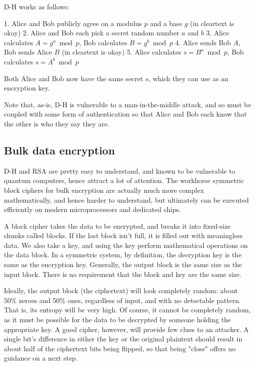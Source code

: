 \documentclass[%
 aip,
 jmp,%
 amsmath,amssymb,
 reprint,%
]{revtex4-1}
\begin{document}
D-H works as follows:

	1. Alice and Bob publicly agree on a modulus $p$ and a base $g$ (in cleartext is okay)
	2. Alice and Bob each pick a secret random number $a$ and $b$
	3. Alice calculates $A = g^a \bmod p$,
	   Bob calculates $B = g^b \bmod p$
	4. Alice sends Bob $A$, Bob sends Alice $B$ (in cleartext is okay)
	5. Alice calculates $s = B^a \bmod p$,
	   Bob calculates $s = A^b \bmod p$

Both Alice and Bob now have the same secret $s$, which they can use as
an encryption key.

Note that, as-is, D-H is vulnerable to a man-in-the-middle attack, and
so must be coupled with some form of authentication so that Alice and
Bob each know that the other is who they say they are.

\subsection{Bulk data encryption}

D-H and RSA are pretty easy to understand, and known to be vulnerable
to quantum computers, hence attract a lot of attention. The workhorse
symmetric block ciphers for bulk encryption are actually much more
complex mathematically, and hence harder to understand, but ultimately
can be executed efficiently on modern microprocessors and dedicated
chips.

A block cipher takes the data to be encrypted, and breaks it into
fixed-size chunks called blocks.  If the last block isn't full, it is
filled out with meaningless data.  We also take a key, and using the
key perform mathematical operations on the data block.  In a symmetric
system, by definition, the decryption key is the same as the
encryption key.  Generally, the output block is the same size as the
input block.  There is no requirement that the block and key are the
same size.

Ideally, the output block (the ciphertext) will look completely
random: about 50\% zeroes and 50\% ones, regardless of input, and with
no detectable pattern.  That is, its entropy will be very high.  Of
course, it cannot be completely random, as it must be possible for the
data to be decrypted by someone holding the appropriate key.  A good
cipher, however, will provide few clues to an attacker.  A single
bit's difference in either the key or the original plaintext should
result in about half of the ciphertext bits being flipped, so that
being "close" offers no guidance on a next step.
\end{document}
